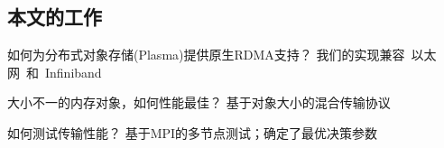 \subsection*{本文的工作}
\begin{frame}
	\begin{block}{如何为分布式对象存储(Plasma)提供原生RDMA支持？}
		我们的实现兼容~以太网~和~Infiniband
	\end{block}
	\begin{block}{大小不一的内存对象，如何性能最佳？}
		基于对象大小的混合传输协议
	\end{block}
	\begin{block}{如何测试传输性能？}
		基于MPI的多节点测试；确定了最优决策参数
	\end{block}
\end{frame}
